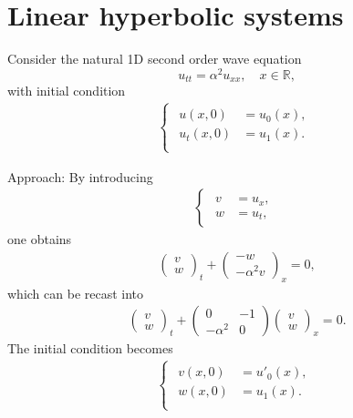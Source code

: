 \documentclass[12pt]{article}
\begin{document}
\section{Linear hyperbolic systems}
\begin{example}
	Consider the natural 1D second order wave equation 
	\begin{equation}
		u_{tt} = \alpha^2 u_{xx},\quad x\in\mathbb{R}, 
	\end{equation}
	with initial condition
	\begin{align}
		\begin{cases}
			\begin{aligned}
				u(x,0)     & = u_{0}(x), \\
				u_{t}(x,0) & = u_{1}(x). \\
			\end{aligned}
		\end{cases}
	\end{align}
\end{example}
Approach: By introducing 
\begin{align}
	\begin{cases}
		\begin{aligned}
			v & = u_{x}, \\
			w & = u_{t},
		\end{aligned}
	\end{cases}
\end{align}
one obtains 
\begin{align}
	\begin{pmatrix} v\\ w\end{pmatrix}_{t}
	+
	\begin{pmatrix} -w \\ -\alpha^2 v \end{pmatrix}_{x}
	= 0,
\end{align}
which can be recast into
\begin{align}
	\begin{pmatrix} v\\ w\end{pmatrix}_{t}
	+
	\begin{pmatrix} 0 & -1 \\ -\alpha^2 & 0 \end{pmatrix}
	\begin{pmatrix} v\\ w\end{pmatrix}_{x}
	= 0.
\end{align}
The initial condition becomes
\begin{align}
	\begin{cases}
		\begin{aligned}
			v(x,0) & = u'_{0}(x), \\
			w(x,0) & = u_{1}(x).  \\
		\end{aligned}
	\end{cases}
\end{align}
\end{document}
